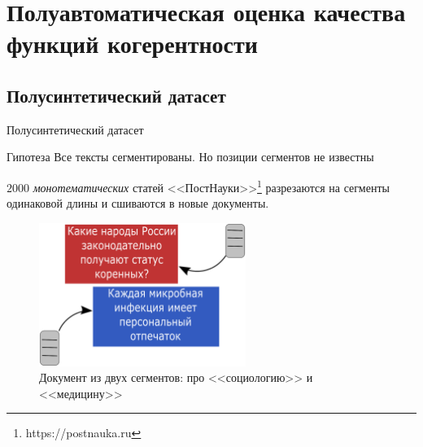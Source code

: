 \documentclass[russian]{beamer}
\begin{document}
\section{Полуавтоматическая оценка качества функций когерентности}

\subsection{Полусинтетический датасет}

\begin{frame}{Полусинтетический датасет}
  \begin{block}{Гипотеза}
    Все тексты сегментированы.
    Но позиции сегментов не известны
  \end{block}
  
  $2000$ \emph{монотематических} статей <<ПостНауки>>\footnote[frame]{https://postnauka.ru} разрезаются на сегменты одинаковой длины и сшиваются в новые документы.
    
  \begin{figure}[h]
    \centering
    \includegraphics[width=0.6\textwidth, height=0.45\textheight]{pn_gen_diagram.eps}
    \caption*{Документ из двух сегментов: про <<социологию>> и <<медицину>>}
  \end{figure}    
\end{frame}
\end{document}
